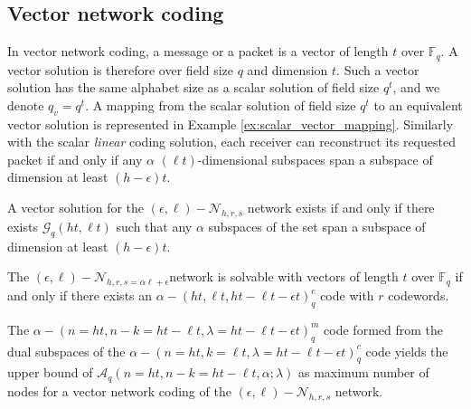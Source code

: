 \subsection{Vector network coding \label{subsec:Vector-network-coding}}

In vector network coding, a message or a packet is a vector of length
$t$ over $\ensuremath{\mathbb{F}}_{q}$. A vector solution is therefore
over field size $q$ and dimension $t$. Such a vector solution has
the same alphabet size as a scalar solution of field size $q^{t}$,
and we denote $q_{v}=q^{t}$. A mapping from the scalar solution of
field size $q^{t}$ to an equivalent vector solution is represented
in Example \ref{ex:scalar_vector_mapping}. Similarly with the scalar
\textit{linear} coding solution, each receiver can reconstruct its
requested packet if and only if any $\alpha$ $\left(\ell t\right)$-dimensional
subspaces span a subspace of dimension at least $\left(h-\epsilon\right)t$.
\begin{thm}
 A vector solution for the $(\epsilon,\ell)-\mathcal{N}_{h,r,s}$
network exists if and only if there exists $\mathcal{G}_{q}\left(ht,\ell t\right)$
such that any $\alpha$ subspaces of the set span a subspace of dimension
at least $\left(h-\epsilon\right)t$. 
\end{thm}
%
\begin{thm}
 The $(\epsilon,\ell)-\mathcal{N}_{h,r,s=\alpha\ell+\epsilon}$network
is solvable with vectors of length $t$ over $\ensuremath{\mathbb{F}}_{q}$
if and only if there exists an $\alpha-\left(ht,\ell t,ht-\ell t-\epsilon t\right)_{q}^{c}$
code with $r$ codewords. 
\end{thm}
\begin{cor}
The $\alpha-\left(n=ht,n-k=ht-\ell t,\lambda=ht-\ell t-\epsilon t\right)_{q}^{m}$
code formed from the dual subspaces of the $\alpha-\left(n=ht,k=\ell t,\lambda=ht-\ell t-\epsilon t\right)_{q}^{c}$
code yields the upper bound of $\mathcal{A}_{q}\left(n=ht,n-k=ht-\ell t,\alpha;\lambda\right)$
as maximum number of nodes for a vector network coding of the $(\epsilon,\ell)-\mathcal{N}_{h,r,s}$
network. \label{cor:dual_subspaces}
\end{cor}
